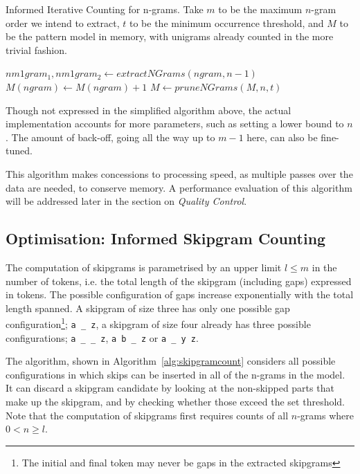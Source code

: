 \begin{algorithm} \caption{Informed Iterative Counting for n-grams.  Take $m$
to be the maximum $n$-gram order we intend to extract, $t$ to be the minimum occurrence threshold, and $M$ to be the
pattern model in memory, with unigrams already counted in the more trivial fashion.}
\label{alg:ngramcounting}
\begin{algorithmic}
            \State  $nm1gram_1, nm1gram_2 \leftarrow extractNGrams(ngram,n-1)$
                \State $M(ngram) \leftarrow M(ngram) + 1$
            \EndIf
        \EndFor
    \EndFor
    \State $M \leftarrow pruneNGrams(M,n,t)$
\EndFor \\
\end{algorithmic}
\end{algorithm}

Though not expressed in the simplified algorithm above, the actual
implementation accounts for more parameters, such as setting a lower bound to
$n$. The amount of back-off, going all the way up to $m-1$ here, can also be
fine-tuned.

This algorithm makes concessions to processing speed, as multiple passes over
the data are needed, to conserve memory. A performance evaluation of this
algorithm will be addressed later in the section on \emph{Quality Control}.

\subsection*{Optimisation: Informed Skipgram Counting}
\label{sec:skipgramcount}

The computation of skipgrams is parametrised by an upper limit $l\leq m$ in the number of
tokens, i.e. the total length of the skipgram (including gaps) expressed in tokens. The possible configuration of gaps increase exponentially with the
total length spanned. A skipgram of size three has only one possible
gap configuration\footnote{The initial and final token may never be gaps in the extracted skipgrams};
\texttt{a \_ z}, a skipgram of size four already has three possible configurations;
\texttt{a \_ \_ z}, \texttt{a b \_ z} or \texttt{a \_ y z}.

The algorithm, shown in Algorithm~\ref{alg:skipgramcount} considers all
possible configurations in which skips can be inserted in all of the n-grams in the model. It can
discard a skipgram candidate by looking at the non-skipped parts that make up
the skipgram, and by checking whether those exceed the set threshold. Note that
the computation of skipgrams first requires counts of all $n$-grams where
$0<n\geq l$.

